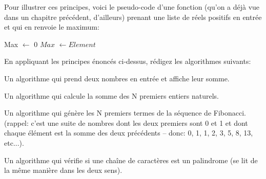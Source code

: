 \documentclass[12pt]{article}
\begin{document}
	Pour illustrer ces principes, voici le pseudo-code d'une fonction (qu'on a déjà vue dans un chapitre précédent, d'ailleurs) prenant une liste de réels positifs en entrée et qui en renvoie le maximum:
	
	\vspace{\baselineskip}
	
	\begin{algorithmic}[1]
		\State Max $\leftarrow$ 0
		\State $Max$ $\leftarrow Element$
		\EndIf
		\EndFor
		\State{}
		\EndFunction
	\end{algorithmic}
	
		\begin{MonExo}
		En appliquant les principes énoncés ci-dessus, rédigez les algorithmes suivants:
		\begin{alphenum}
			\item Un algorithme qui prend deux nombres en entrée et affiche leur somme.
			\item Un algorithme qui calcule la somme des N premiers entiers naturels.
			\item Un algorithme qui génère les N premiers termes de la séquence de Fibonacci. (rappel: c'est une suite de nombres dont les deux premiers sont 0 et 1 et dont chaque élément est la somme des deux précédents -- donc: 0, 1, 1, 2, 3, 5, 8, 13, etc...).
			\item Un algorithme qui vérifie si une chaîne de caractères est un palindrome (se lit de la même manière dans les deux sens).
		\end{alphenum}
	\end{MonExo}
	
\end{document}
